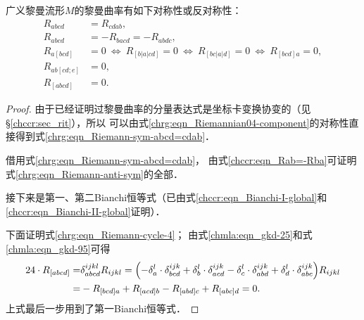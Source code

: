 \begin{theorem}\label{chrg:thm_Riemann-Sym-Properties}
广义黎曼流形$M$的黎曼曲率有如下对称性或反对称性：
\begin{align}
    R_{abcd} &= R_{cdab}, \label{chrg:eqn_Riemann-sym-abcd=cdab} \\
    R_{abcd} &= -R_{bacd} = -R_{abdc}, \label{chrg:eqn_Riemann-anti-sym}\\
    R_{a[bcd]} &= 0 \ \Leftrightarrow \ R_{[b|a|cd]} = 0
       \ \Leftrightarrow \ R_{[bc|a|d]} = 0 \ \Leftrightarrow \ R_{[bcd]a} = 0, \\
    R_{ab[cd;e]} &= 0, \\
    R_{[abcd]} &= 0 \label{chrg:eqn_Riemann-cycle-4}.
\end{align}
\end{theorem}
\begin{proof}
    由于已经证明过黎曼曲率的分量表达式是坐标卡变换协变的（见\S \ref{chccr:sec_rit}），所以
    可以由式\eqref{chrg:eqn_Riemannian04-component}的对称性直接得到式\eqref{chrg:eqn_Riemann-sym-abcd=cdab}．

    借用式\eqref{chrg:eqn_Riemann-sym-abcd=cdab}，
    由式\eqref{chccr:eqn_Rab=-Rba}可证明式\eqref{chrg:eqn_Riemann-anti-sym}的全部．

    接下来是第一、第二Bianchi恒等式（已由式\eqref{chccr:eqn_Bianchi-I-global}和\eqref{chccr:eqn_Bianchi-II-global}证明）．

    下面证明式\eqref{chrg:eqn_Riemann-cycle-4}；
    由式\eqref{chmla:eqn_gkd-25}和式\eqref{chmla:eqn_gkd-95}可得
    \begin{align*}
        24 \cdot R_{[abcd]}  =& \delta_{abcd}^{ijkl} R_{ijkl}
        =\Bigl(-\delta_{a}^{l} \cdot \delta_{bcd}^{ijk} +\delta_{b}^{l} \cdot \delta_{acd}^{ijk}
         -\delta_{c}^{l} \cdot \delta_{abd}^{ijk}  +\delta_{d}^{l} \cdot \delta_{abc}^{ijk} \Bigr)R_{ijkl} \\
        =& -R_{[bcd]a} + R_{[acd]b} - R_{[abd]c} + R_{[abc]d} =0 .
    \end{align*}
    上式最后一步用到了第一Bianchi恒等式．
\end{proof}

